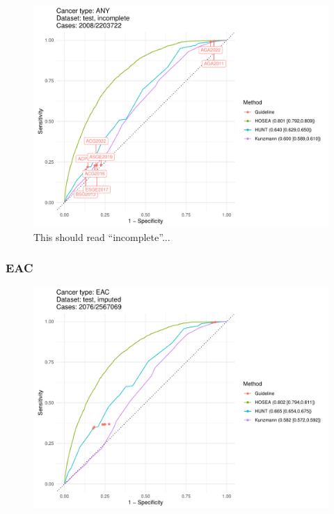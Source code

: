 \documentclass[12pt]{article}
\begin{document}
\begin{figure}[ht]
\includegraphics[width=1.0\linewidth]{comparison/ANY_incomplete.pdf}
\caption{This should read ``incomplete''...}
\end{figure}

\clearpage
\newpage
\subsubsection{EAC}

\begin{figure}[ht]
\includegraphics[width=1.0\linewidth]{comparison/EAC_imputed.pdf}
\end{figure}
\end{document}
